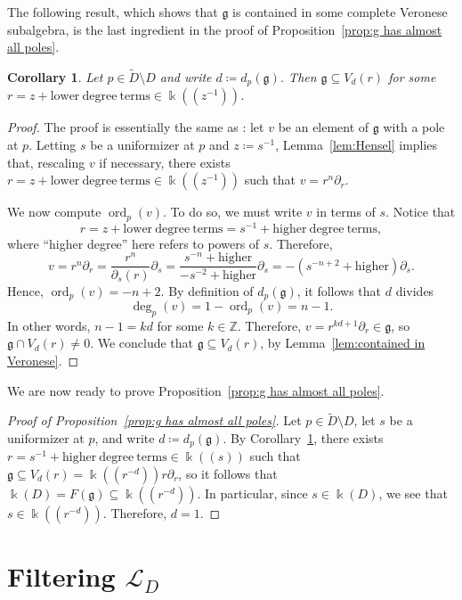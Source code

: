 \documentclass[12pt]{amsart}
\theoremstyle{plain}
\newtheorem{corollary}[theorem]{Corollary}
\theoremstyle{definition}
\numberwithin{equation}{section}
\def\g{\mathfrak{g}}
\def\L{\mathcal{L}}
\def\ZZ{\mathbb{Z}}
\def\kk{\Bbbk}
\DeclareMathOperator{\ord}{ord}
\def\del{\partial}
\begin{document}
The following result, which shows that $\g$ is contained in some complete Veronese subalgebra, is the last ingredient in the proof of Proposition~\ref{prop:g has almost all poles}.

\begin{corollary}\label{cor:contained in Veronese}
    Let $p \in \widetilde{D} \setminus D$ and write $d \coloneqq d_p(\g)$. Then $\g \subseteq V_d(r)$ for some $r = z + \mathrm{lower~degree~terms} \in \kk((z^{-1}))$.
\end{corollary}
\begin{proof}
    The proof is essentially the same as \cite[Corollary 3.6]{BellBuzaglo}: let $v$ be an element of $\g$ with a pole at $p$. Letting $s$ be a uniformizer at $p$ and $z \coloneqq s^{-1}$, Lemma~\ref{lem:Hensel} implies that, rescaling $v$ if necessary, there exists $r = z + \mathrm{lower~degree~terms} \in \kk((z^{-1}))$ such that $v = r^n \del_r$.
    
    We now compute $\ord_p(v)$. To do so, we must write $v$ in terms of $s$. Notice that
    $$r = z + \mathrm{lower~degree~terms} = s^{-1} + \mathrm{higher~degree~terms},$$
    where ``higher degree'' here refers to powers of $s$. Therefore,
    $$v = r^n \del_r = \frac{r^n}{\del_s(r)} \del_s = \frac{s^{-n} + \mathrm{higher}}{-s^{-2} + \mathrm{higher}} \del_s = -(s^{-n + 2} + \mathrm{higher}) \del_s.$$
    Hence, $\ord_p(v) = -n + 2$. By definition of $d_p(\g)$, it follows that $d$ divides
    $$\deg_p(v) = 1 - \ord_p(v) = n - 1.$$ 
    In other words, $n - 1 = kd$ for some $k \in \ZZ$. Therefore, $v = r^{kd + 1} \del_r \in \g$, so $\g \cap V_d(r) \neq 0$. We conclude that $\g \subseteq V_d(r)$, by Lemma~\ref{lem:contained in Veronese}.
\end{proof}

We are now ready to prove Proposition~\ref{prop:g has almost all poles}.

\begin{proof}[Proof of Proposition~\ref{prop:g has almost all poles}]
    Let $p \in \widetilde{D} \setminus D$, let $s$ be a uniformizer at $p$, and write $d \coloneqq d_p(\g)$. By Corollary~\ref{cor:contained in Veronese}, there exists $r = s^{-1} + \mathrm{higher~degree~terms} \in \kk((s))$ such that $\g \subseteq V_d(r) = \kk((r^{-d}))r\del_r$, so it follows that $\kk(D) = F(\g) \subseteq \kk((r^{-d}))$. In particular, since $s \in \kk(D)$, we see that $s \in \kk((r^{-d}))$. Therefore, $d = 1$.
\end{proof}

\section{Filtering \texorpdfstring{$\L_D$}{TD}}\label{sec:filtration}
\end{document}

